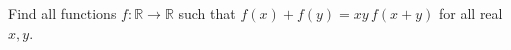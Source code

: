Find all functions $f:\mathbb{R}\to\mathbb{R}$ such that $f(x)+f(y)=xy\,f(x+y)$ for all real $x,y$.

